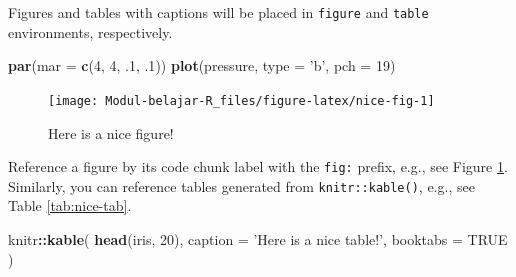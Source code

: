 \documentclass[
]{book}
\newenvironment{Shaded}{\begin{snugshade}}{\end{snugshade}}
\newcommand{\DataTypeTok}[1]{\textcolor[rgb]{0.13,0.29,0.53}{#1}}
\newcommand{\DecValTok}[1]{\textcolor[rgb]{0.00,0.00,0.81}{#1}}
\newcommand{\FloatTok}[1]{\textcolor[rgb]{0.00,0.00,0.81}{#1}}
\newcommand{\KeywordTok}[1]{\textcolor[rgb]{0.13,0.29,0.53}{\textbf{#1}}}
\newcommand{\NormalTok}[1]{#1}
\newcommand{\OperatorTok}[1]{\textcolor[rgb]{0.81,0.36,0.00}{\textbf{#1}}}
\newcommand{\OtherTok}[1]{\textcolor[rgb]{0.56,0.35,0.01}{#1}}
\newcommand{\StringTok}[1]{\textcolor[rgb]{0.31,0.60,0.02}{#1}}
\begin{document}
Figures and tables with captions will be placed in \texttt{figure} and \texttt{table} environments, respectively.

\begin{Shaded}
\begin{Highlighting}[]
\KeywordTok{par}\NormalTok{(}\DataTypeTok{mar =} \KeywordTok{c}\NormalTok{(}\DecValTok{4}\NormalTok{, }\DecValTok{4}\NormalTok{, }\FloatTok{.1}\NormalTok{, }\FloatTok{.1}\NormalTok{))}
\KeywordTok{plot}\NormalTok{(pressure, }\DataTypeTok{type =} \StringTok{'b'}\NormalTok{, }\DataTypeTok{pch =} \DecValTok{19}\NormalTok{)}
\end{Highlighting}
\end{Shaded}

\begin{figure}

{\centering \texttt{[image: Modul-belajar-R\_files/figure-latex/nice-fig-1]} 

}

\caption{Here is a nice figure!}\label{fig:nice-fig}
\end{figure}

Reference a figure by its code chunk label with the \texttt{fig:} prefix, e.g., see Figure \ref{fig:nice-fig}. Similarly, you can reference tables generated from \texttt{knitr::kable()}, e.g., see Table \ref{tab:nice-tab}.

\begin{Shaded}
\begin{Highlighting}[]
\NormalTok{knitr}\OperatorTok{::}\KeywordTok{kable}\NormalTok{(}
  \KeywordTok{head}\NormalTok{(iris, }\DecValTok{20}\NormalTok{), }\DataTypeTok{caption =} \StringTok{'Here is a nice table!'}\NormalTok{,}
  \DataTypeTok{booktabs =} \OtherTok{TRUE}
\NormalTok{)}
\end{Highlighting}
\end{Shaded}
\end{document}
